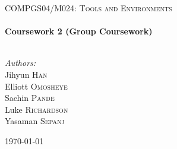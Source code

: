 \begin{titlepage}
\begin{center}

\textsc{\LARGE COMPGS04/M024: Tools and Environments}\\[2cm]

\HRule \\[0.4cm]
{ \huge \bfseries Coursework 2 (Group Coursework) \\[0.4cm] }

\HRule \\[1.5cm]

\large\emph{Authors:}\\
Jihyun \textsc{Han}\\
Elliott \textsc{Omosheye}\\
Sachin \textsc{Pande}\\
Luke \textsc{Richardson}\\
Yasaman \textsc{Sepanj}

\vfill
{\large \today}
\end{center}
\end{titlepage}